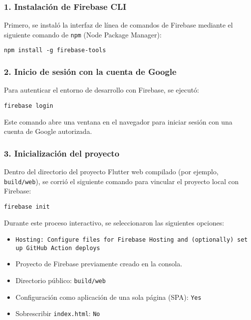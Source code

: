 \subsubsection{1. Instalación de Firebase CLI}

Primero, se instaló la interfaz de línea de comandos de Firebase mediante el siguiente comando de \texttt{npm} (Node Package Manager):

\begin{verbatim}
npm install -g firebase-tools
\end{verbatim}

\subsubsection{2. Inicio de sesión con la cuenta de Google}

Para autenticar el entorno de desarrollo con Firebase, se ejecutó:

\begin{verbatim}
firebase login
\end{verbatim}

Este comando abre una ventana en el navegador para iniciar sesión con una cuenta de Google autorizada.

\subsubsection{3. Inicialización del proyecto}

Dentro del directorio del proyecto Flutter web compilado (por ejemplo, \texttt{build/web}), se corrió el siguiente comando para vincular el proyecto local con Firebase:

\begin{verbatim}
firebase init
\end{verbatim}

Durante este proceso interactivo, se seleccionaron las siguientes opciones:

\begin{itemize}
    \item \texttt{Hosting: Configure files for Firebase Hosting and (optionally) set up GitHub Action deploys}
    \item Proyecto de Firebase previamente creado en la consola.
    \item Directorio público: \texttt{build/web}
    \item Configuración como aplicación de una sola página (SPA): \texttt{Yes}
    \item Sobrescribir \texttt{index.html}: \texttt{No}
\end{itemize}

